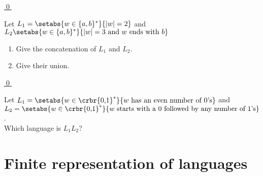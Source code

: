 \documentclass[11pt]{article}
\begin{document}
{\begin{uexercise}
\hyperlink{extf1sol}{\qed}
\end{uexercise}


\begin{uexercise}\label{exconcuni}
Let $L_1 = \setabs{w \in \{ a,b\}^*}{|w| = 2}$ and $L_2\setabs{w \in \{ a,b\}^*}{|w| = 3 \text{ and } w \text{ ends with } b}$

\begin{enumerate}
\item\label{exconcunia} Give the concatenation of $L_1$ and $L_2$.
\item\label{exconcunib} Give their union.
\end{enumerate}

\hyperlink{exconcunisol}{\qed}
\end{uexercise}



\begin{uexercise}\label{lang-desc}
Let $L_1=\setabs{w \in \crbr{\text{0,1}}^*}{w \text{ has an even number of
0's}}$ and  \\
$L_2= \setabs{w \in \crbr{\text{0,1}}^*}{w \text{ starts
with a 0 followed by any number of 1's}}$. \\ Which language is $L_1L_2$?
\end{uexercise}
\hrulefill

}

\section{Finite representation of languages}
\end{document}
